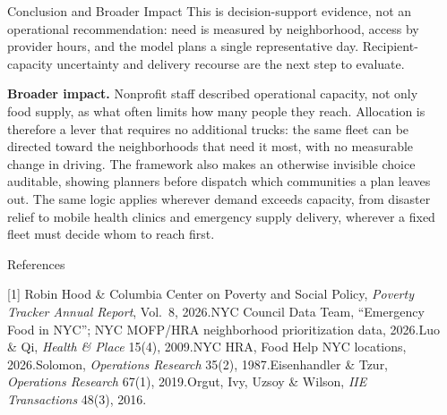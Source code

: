 \documentclass[final]{beamer}
\newlength{\sepwidth}
\newlength{\colwidth}
\newcommand{\separatorcolumn}{\begin{column}{\sepwidth}\end{column}}
\begin{document}
\begin{frame}[t]
\begin{columns}[t]
\begin{column}{\colwidth}
\begin{block}{Conclusion and Broader Impact}
    This is decision-support evidence, not an operational recommendation: need is
    measured by neighborhood, access by provider hours, and the model plans a
    single representative day. Recipient-capacity uncertainty and delivery recourse are the next step to evaluate.

    \textbf{Broader impact.} Nonprofit staff described operational capacity, not only food supply, as what
    often limits how many people they reach. Allocation is therefore a lever
    that requires no additional trucks: the same fleet can be directed toward the
    neighborhoods that need it most, with no measurable change in driving. The
    framework also makes an otherwise invisible choice auditable, showing
    planners before dispatch which communities a plan leaves out. The same logic
    applies wherever demand exceeds capacity, from disaster relief to mobile
    health clinics and emergency supply delivery, wherever a fixed fleet must decide whom to reach first.

  \end{block}

\vspace{0.8em}

  \begin{block}{References}

    \small
    [1] Robin Hood \& Columbia Center on Poverty and Social Policy, \textit{Poverty
    Tracker Annual Report}, Vol.~8, 2026.\newline
    [2] NYC Council Data Team, ``Emergency Food in NYC''; NYC MOFP/HRA
    neighborhood prioritization data, 2026.\newline
    [3] Luo \& Qi, \textit{Health \& Place} 15(4), 2009.\newline
    [4] NYC HRA, Food Help NYC locations, 2026.\newline
    [5] Solomon, \textit{Operations Research} 35(2), 1987.\newline
    [6] Eisenhandler \& Tzur, \textit{Operations Research} 67(1), 2019.\newline
    [7] Orgut, Ivy, Uzsoy \& Wilson, \textit{IIE Transactions} 48(3), 2016.

  \end{block}

\end{column}

\separatorcolumn
\end{columns}
\end{frame}
\end{document}
